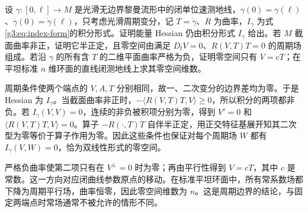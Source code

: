 \begin{exercise}\label{g3:ex:periodic-variation-nonpositive-curvature}
	设 \(\gamma:[0,\ell]\to M\) 是光滑无边界黎曼流形中的闭单位速测地线，\(\gamma(0)=\gamma(\ell)\)、\(\dot\gamma(0)=\dot\gamma(\ell)\)，只考虑光滑周期变分，记 \(T=\dot\gamma\)、\(R\) 为曲率，\(I_\gamma\) 为式\eqref{g3:eq:index-form}的积分形式。证明能量 Hessian 仍由积分形式 \(I_\gamma\) 给出。若 \(M\) 截面曲率非正，证明它半正定，且零空间由满足 \(D_tV=0\)、\(R(V,T)T=0\) 的周期场组成。若沿 \(\gamma\) 的所有含 \(T\) 的二维平面曲率严格为负，证明零空间只有 \(V=cT\)；在平坦标准 \(n\) 维环面的直线闭测地线上求其零空间维数。
\end{exercise}
\begin{solution}
	周期条件使两个端点的 \(V,A,T\) 分别相同，故一、二次变分的边界差均为零。于是 Hessian 为 \(I_\gamma\)。当截面曲率非正时，\(-\langle R(V,T)T,V\rangle\ge0\)，所以积分的两项都非负。若 \(I_\gamma(V,V)=0\)，连续的非负被积项分别为零，得到 \(V'=0\) 和 \(\langle R(V,T)T,V\rangle=0\)。算子 \(-R(\cdot,T)T\) 自伴半正定，用正交特征基展开知其二次型为零等价于算子作用为零。因此这些条件也保证对每个周期场 \(W\) 都有 \(I_\gamma(V,W)=0\)，恰为双线性形式的零空间。

	严格负曲率使第二项只有在 \(V^\perp=0\) 时为零；再由平行性得到 \(V=cT\)，其中 \(c\) 是常数。这一方向对应闭曲线参数原点的移动。在标准平坦环面中，所有常系数场都下降为周期平行场，曲率恒零，因此零空间维数为 \(n\)。这是周期边界的结论，与固定两端点时常场通常不被允许的情形不同。
\end{solution}

